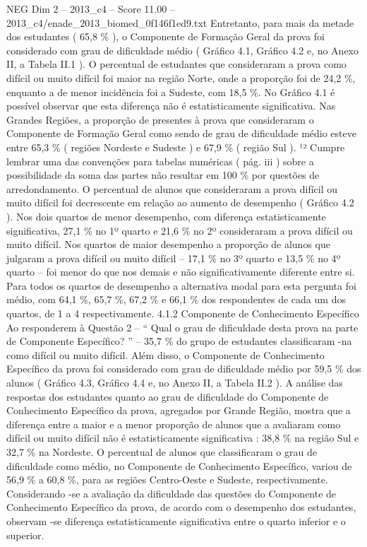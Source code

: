 \begin{textsample}{NEG Dim 2 – 2013\_c4 – Score 11.00 – 2013\_c4/enade\_2013\_biomed\_0f146f1ed9.txt}
Entretanto, para mais da metade dos estudantes ( 65,8 \% ), o Componente de Formação Geral da prova foi considerado com grau de dificuldade médio ( Gráfico 4.1, Gráfico 4.2 e, no Anexo II, a Tabela II.1 ).
O percentual de estudantes que consideraram a prova como difícil ou muito difícil foi maior na região Norte, onde a proporção foi de 24,2 \%, enquanto a de menor incidência foi a Sudeste, com 18,5 \%.
No Gráfico 4.1 é possível observar que esta diferença não é estatisticamente significativa.
Nas Grandes Regiões, a proporção de presentes à prova que consideraram o Componente de Formação Geral como sendo de grau de dificuldade médio esteve entre 65,3 \% ( regiões Nordeste e Sudeste ) e 67,9 \% ( região Sul ). ¹² Cumpre lembrar uma das convenções para tabelas numéricas ( pág. iii ) sobre a possibilidade da soma das partes não resultar em 100 \% por questões de arredondamento.
O percentual de alunos que consideraram a prova difícil ou muito difícil foi decrescente em relação ao aumento de desempenho ( Gráfico 4.2 ).
Nos dois quartos de menor desempenho, com diferença estatisticamente significativa, 27,1 \% no 1º quarto e 21,6 \% no 2º consideraram a prova difícil ou muito difícil.
Nos quartos de maior desempenho a proporção de alunos que julgaram a prova difícil ou muito difícil – 17,1 \% no 3º quarto e 13,5 \% no 4º quarto – foi menor do que nos demais e não significativamente diferente entre si.
Para todos os quartos de desempenho a alternativa modal para esta pergunta foi médio, com 64,1 \%, 65,7 \%, 67,2 \% e 66,1 \% dos respondentes de cada um dos quartos, de 1 a 4 respectivamente. 4.1.2 Componente de Conhecimento Específico Ao responderem à Questão 2 – “ Qual o grau de dificuldade desta prova na parte de Componente Específico? ” – 35,7 \% do grupo de estudantes classificaram -na como difícil ou muito difícil.
Além disso, o Componente de Conhecimento Específico da prova foi considerado com grau de dificuldade médio por 59,5 \% dos alunos ( Gráfico 4.3, Gráfico 4.4 e, no Anexo II, a Tabela II.2 ).
A análise das respostas dos estudantes quanto ao grau de dificuldade do Componente de Conhecimento Específico da prova, agregados por Grande Região, mostra que a diferença entre a maior e a menor proporção de alunos que a avaliaram como difícil ou muito difícil não é estatisticamente significativa : 38,8 \% na região Sul e 32,7 \% na Nordeste.
O percentual de alunos que classificaram o grau de dificuldade como médio, no Componente de Conhecimento Específico, variou de 56,9 \% a 60,8 \%, para as regiões Centro-Oeste e Sudeste, respectivamente.
Considerando -se a avaliação da dificuldade das questões do Componente de Conhecimento Específico da prova, de acordo com o desempenho dos estudantes, observam -se diferença estatisticamente significativa entre o quarto inferior e o superior.

\end{textsample}
